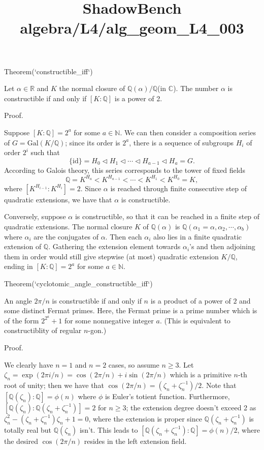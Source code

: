 \documentclass{article}
\title{ShadowBench algebra/L4/alg\_geom\_L4\_003}
\begin{document}
\maketitle

Theorem(`constructible_iff`)

Let $\alpha \in \mathbb{R}$ and $K$ the normal closure of $\mathbb{Q}(\alpha)/\mathbb{Q}$(in $\mathbb{C}$). The number $\alpha$ is constructible if and only if $[K:\mathbb{Q}]$ is a power of 2.

Proof.

Suppose $[K:\mathbb{Q}] = 2^a$ for some $a \in \mathbb{N}$. We can then consider a composition series of $G = \mathrm{Gal}(K/\mathbb{Q})$; since its order is $2^a$, there is a sequence of subgroups $H_i$ of order $2^i$ such that
$$
\{\mathrm{id}\} = H_0 \triangleleft H_1 \triangleleft \cdots \triangleleft H_{a-1} \triangleleft H_a = G.
$$
According to Galois theory, this series corresponds to the tower of fixed fields
$$
\mathbb{Q} = K^{H_a} < K^{H_{a-1}} < \cdots < K^{H_1} < K^{H_0} = K,
$$
where $[K^{H_{i-1}}:K^{H_i}] = 2$. Since $\alpha$ is reached through finite consecutive step of quadratic extensions, we have that $\alpha$ is constructible.

Conversely, suppose $\alpha$ is constructible, so that it can be reached in a finite step of quadratic extensions. The normal closure $K$ of $\mathbb{Q}(\alpha)$ is $\mathbb{Q}(\alpha_1 = \alpha, \alpha_2, \cdots, \alpha_b)$ where $\alpha_i$ are the conjugates of $\alpha$. Then each $\alpha_i$ also lies in a finite quadratic extension of $\mathbb{Q}$. Gathering the extension element towards $\alpha_i$'s and then adjoining them in order would still give stepwise (at most) quadratic extension $K/\mathbb{Q}$, ending in $[K:\mathbb{Q}] = 2^a$ for some $a \in \mathbb{N}$.

Theorem(`cyclotomic_angle_constructible_iff`)

An angle $2\pi/n$ is constructible if and only if $n$ is a product of a power of $2$ and some distinct Fermat primes. Here, the Fermat prime is a prime number which is of the form $2^{2^a}+1$ for some nonnegative integer $a$. (This is equivalent to constructiblity of regular $n$-gon.)

Proof.

We clearly have $n = 1$ and $n = 2$ cases, so assume $n \ge 3$. Let $\zeta_n = \exp(2\pi i/n) = \cos (2\pi/n) + i \sin (2\pi/n)$ which is a primitive $n$-th root of unity; then we have that $\cos(2\pi/n) = (\zeta_n + \zeta_n^{-1})/2$. Note that $[\mathbb{Q}(\zeta_n):\mathbb{Q}] = \phi(n)$ where $\phi$ is Euler's totient function. Furthermore, $[\mathbb{Q}(\zeta_n):\mathbb{Q}(\zeta_n + \zeta_n^{-1})] = 2$ for $n \ge 3$; the extension degree doesn't exceed 2 as $\zeta_n^2 - (\zeta_n + \zeta_n^{-1})\zeta_n + 1 = 0$, where the extension is proper since $\mathbb{Q}(\zeta_n + \zeta_n^{-1})$ is totally real but $\mathbb{Q}(\zeta_n)$ isn't. This leads to $[\mathbb{Q}(\zeta_n + \zeta_n^{-1}) : \mathbb{Q}] = \phi(n)/2$, where the desired $\cos(2\pi/n)$ resides in the left extension field.
\end{document}

